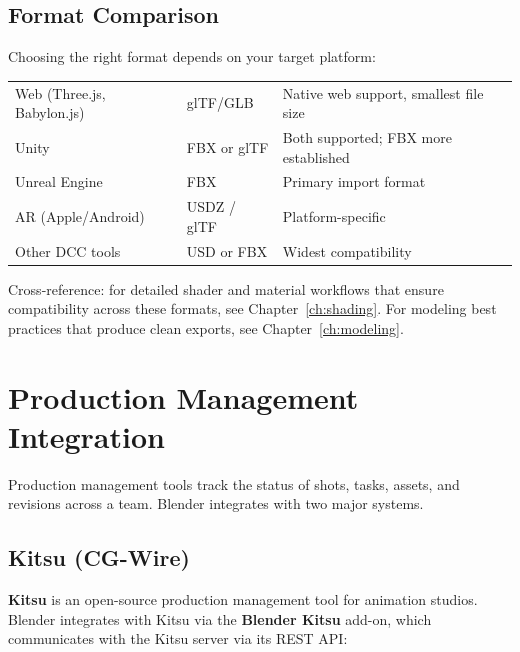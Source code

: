 \subsection{Format Comparison}

Choosing the right format depends on your target platform:

\begin{center}
\begin{tabularx}{\textwidth}{L{4cm}L{3cm}X}
\toprule
{}
 &  &  \\
\midrule
Web (Three.js, Babylon.js) & glTF/GLB & Native web support, smallest file size \\
Unity & FBX or glTF & Both supported; FBX more established \\
Unreal Engine & FBX & Primary import format \\
AR (Apple/Android) & USDZ / glTF & Platform-specific \\
Other DCC tools & USD or FBX & Widest compatibility \\
\bottomrule
\end{tabularx}
\end{center}

Cross-reference: for detailed shader and material workflows that ensure compatibility across these formats, see Chapter~\ref{ch:shading}. For modeling best practices that produce clean exports, see Chapter~\ref{ch:modeling}.


\section{Production Management Integration}
\label{sec:scripting-production}

Production management tools track the status of shots, tasks, assets, and revisions across a team. Blender integrates with two major systems.

\subsection{Kitsu (CG-Wire)}

\textbf{Kitsu} is an open-source production management tool for animation studios. Blender integrates with Kitsu via the \textbf{Blender Kitsu} add-on, which communicates with the Kitsu server via its REST API:

